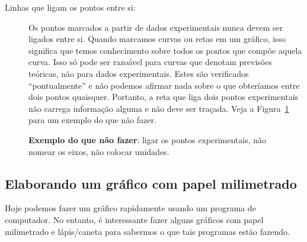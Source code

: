 \begin{description}
	\item[Linhas que ligam os pontos entre si:] Os pontos marcados a partir de dados experimentais nunca devem ser ligados entre si. Quando marcamos curvas ou retas em um gráfico, isso significa que temos conhecimento sobre todos os pontos que compõe aquela curva. Isso só pode ser razoável para curvas que denotam previsões teóricas, não para dados experimentais. Estes são verificados ``pontualmente'' e não podemos afirmar nada sobre o que obteríamos entre dois pontos quaisquer. Portanto, a reta que liga dois pontos experimentais não carrega informação alguma e não deve ser traçada. Veja a Figura~\ref{GraficoErrado} para um exemplo do que não fazer.
\end{description}

\begin{figure}
\centering
\forcerectofloat

\caption{\textbf{Exemplo do que não fazer}: ligar os pontos experimentais, não nomear os eixos, não colocar unidades.}
\label{GraficoErrado}
\end{figure}

%

\subsection{Elaborando um gráfico com papel milimetrado}

Hoje podemos fazer um gráfico rapidamente usando um programa de computador. No entanto, é interessante fazer alguns gráficos com papel milimetrado e lápis/caneta para sabermos o que tais programas estão fazendo.

